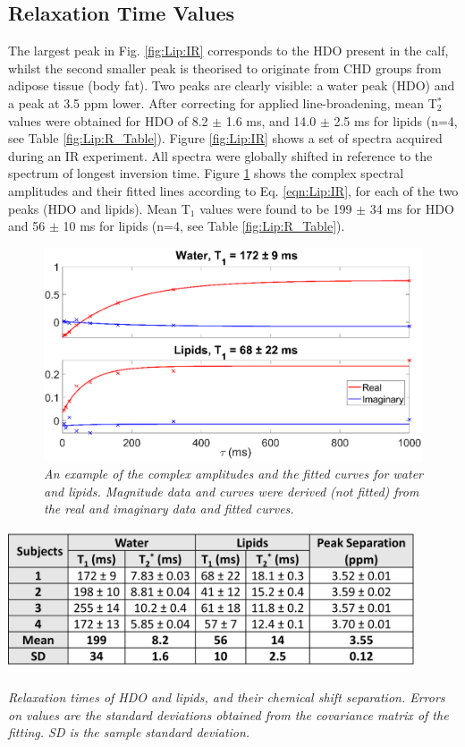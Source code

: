 \subsection{Relaxation Time Values}

The largest peak in Fig. \ref{fig:Lip:IR} corresponds to the HDO present in the calf, whilst the second smaller peak is theorised to originate from CHD groups from adipose tissue (body fat). Two peaks are clearly visible: a water peak (\ac{HDO}) and a peak at 3.5 ppm lower. After correcting for applied line-broadening, mean T$_2^*$ values were obtained for \ac{HDO} of 8.2 $\pm$ 1.6 ms, and 14.0 $\pm$ 2.5 ms for lipids (n=4, see Table \ref{fig:Lip:R_Table}). Figure \ref{fig:Lip:IR} shows a set of spectra acquired during an \ac{IR} experiment. All spectra were globally shifted in reference to the spectrum of longest inversion time. Figure \ref{fig:Lip:Amp_Tau} shows the complex spectral amplitudes and their fitted lines according to Eq. \ref{eqn:Lip:IR}, for each of the two peaks (\ac{HDO} and lipids). Mean T$_1$ values were found to be 199 $\pm$ 34 ms for \ac{HDO} and 56 $\pm$ 10 ms for lipids (n=4, see Table \ref{fig:Lip:R_Table}).

\begin{figure}
    \centering
    \includegraphics[width=1\textwidth]{Figures/Lipid/Amp_Tau.png}
    \caption{\textit{An example of the complex amplitudes and the fitted curves for water and lipids. Magnitude data and curves were derived (not fitted) from the real and imaginary data and fitted curves.}}
    \label{fig:Lip:Amp_Tau}
\end{figure}

\begin{table}
    \centering
    \includegraphics[width=0.9\textwidth]{Figures/Lipid/Relaxation_Table.png}
    \caption{\textit{Relaxation times of \ac{HDO} and lipids, and their chemical shift separation. Errors on values are the standard deviations obtained from the covariance matrix of the fitting. SD is the sample standard deviation.}}
    \label{fig:Lip:R_Table}
\end{table}


